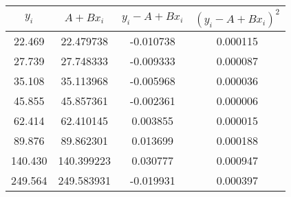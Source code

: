 \begin{tabular}{cccc}
\toprule
  $y_i$ &   $A+Bx_i$ &  $y_i - A+Bx_i$ &  $(y_i - A+Bx_i)^2$ \\
\midrule
 22.469 &  22.479738 &       -0.010738 &            0.000115 \\
 27.739 &  27.748333 &       -0.009333 &            0.000087 \\
 35.108 &  35.113968 &       -0.005968 &            0.000036 \\
 45.855 &  45.857361 &       -0.002361 &            0.000006 \\
 62.414 &  62.410145 &        0.003855 &            0.000015 \\
 89.876 &  89.862301 &        0.013699 &            0.000188 \\
140.430 & 140.399223 &        0.030777 &            0.000947 \\
249.564 & 249.583931 &       -0.019931 &            0.000397 \\
\bottomrule
\end{tabular}
